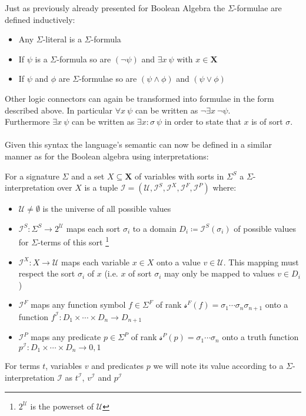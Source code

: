 \begin{definition}
Just as previously already presented for Boolean Algebra the $\Sigma$-formulae are defined inductively:
\begin{itemize}
    \item Any $\Sigma$-literal is a $\Sigma$-formula
    \item If $\psi$ is a $\Sigma$-formula so are $\left(\neg\psi\right)$ and $\exists x\ \psi$ with $x\in\mathbf{X}$
    \item If $\psi$ and $\phi$ are $\Sigma$-formulae so are $\left(\psi\land\phi\right)$ and $\left(\psi\lor\phi\right)$
\end{itemize}
\end{definition}
Other logic connectors can again be transformed into formulae in the form described above. In particular $\forall x\ \psi$ can be written as $\neg\exists x\ \neg\psi$.\\
Furthermore $\exists x\ \psi$ can be written as $\exists x\colon\!\sigma\ \psi$ in order to state that $x$ is of sort $\sigma$.

\paragraph{}
Given this syntax the language's semantic can now be defined in a similar manner as for the Boolean algebra using interpretations:

\begin{definition}
For a signature $\Sigma$ and a set $X\subseteq\mathbf{X}$ of variables with sorts in $\Sigma^S$ a $\Sigma$-interpretation over $X$ is a tuple
$\mathcal{I}=\left(\mathcal{U},\mathcal{I}^S, \mathcal{I}^X, \mathcal{I}^F, \mathcal{I}^P\right)$
where:
\begin{itemize}
    \item $\mathcal{U}\neq\emptyset$ is the universe of all possible values
    \item $\mathcal{I}^S\colon\Sigma^S\to2^\mathcal{U}$ 
        maps each sort $\sigma_i$ to a domain $D_i\coloneqq\mathcal{I}^S\left(\sigma_i\right)$ of possible values for $\Sigma$-terms of this sort
        \footnote{$2^\mathcal{U}$ is the powerset of $\mathcal{U}$}
    \item $\mathcal{I}^X\colon X\to \mathcal{U}$ maps each variable $x\in X$ onto a value $v\in\mathcal{U}$. This mapping must respect the sort $\sigma_i$ of $x$ (i.e. $x$ of sort $\sigma_i$ may only be mapped to values $v\in D_i$)
    \item $\mathcal{I}^F$ maps any function symbol $f\in\Sigma^F$ of rank  $\mathcal{s}^F\left(f\right)=\sigma_1\dotsi\sigma_n\sigma_{n+1}$ onto a function $f^\mathcal{I}\colon D_1\times\dotsi\times D_n \to D_{n+1}$
    \item $\mathcal{I}^P$ maps any predicate $p\in\Sigma^P$ of rank $\mathcal{s}^P\left(p\right)=\sigma_1\dotsi\sigma_n$ onto a truth function $p^\mathcal{I}\colon D_1\times\dotsi\times D_n \to {0,1}$
\end{itemize}
\end{definition}
For terms $t$, variables $v$ and predicates $p$ we will note its value according to a $\Sigma$-interpretation $\mathcal{I}$ as $t^\mathcal{I}$, $v^\mathcal{I}$ and $p^\mathcal{I}$

